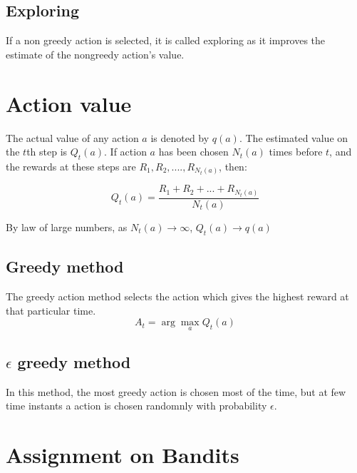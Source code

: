 \documentclass[12pt]{article}
\begin{document}
\subsection{Exploring}
If a non greedy action is selected, it is called exploring as it improves the estimate of the nongreedy action’s value.

\section{Action value}%
The actual value of any action $a$ is denoted by $q(a)$. The estimated value on the $t$th step is $Q_t(a)$. If action $a$ has been chosen $N_t(a)$ times before $t$, and the rewards at these steps are $R_1, R_2,....,R_{N_t(a)}$, then:
 
 \begin{equation}
     Q_t(a)=\frac{R_1+R_2+...+R_{N_t(a)}}{N_t(a)}
 \end{equation}    
 
 By law of large numbers, as $N_t(a)\to \infty$, $Q_t(a) \to q(a)$




\subsection{Greedy method}%
The greedy action method selects the action which gives the highest reward at that particular time. 
\begin{equation}
     A_t=\arg \max_{a} Q_t(a)
 \end{equation}    
 
\subsection{$\epsilon$ greedy method}
In this method, the most greedy action is chosen most of the time, but at few time instants a action is chosen randomnly with probability $\epsilon$.

\section{Assignment on Bandits}
\end{document}
